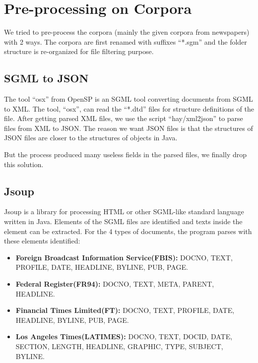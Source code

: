 \section{Pre-processing on Corpora}

We tried to pre-process the corpora (mainly the given corpora from newspapers) with 2 ways.
The corpora are first renamed with suffixes \enquote{*.sgm} and the folder structure is re-organized for file filtering purpose.

\subsection{SGML to JSON}

The tool \enquote{osx} from OpenSP\cite{openSP} is an SGML tool converting documents from SGML to XML. The tool, \enquote{osx}, can read the \enquote{*.dtd} files for structure definitions of the file. After getting parsed XML files, we use the script \enquote{hay/xml2json} to parse files from XML to JSON. The reason we want JSON files is that the structures of JSON files are closer to the structures of objects in Java.

But the process produced many useless fields in the parsed files, we finally drop this solution.

\subsection{Jsoup}

Jsoup is a library for processing HTML or other SGML-like standard language written in Java. Elements of the SGML files are identified and texts inside the element can be extracted. For the 4 types of documents, the program parses with these elements identified:
\vspace{.1cm}
\begin{itemize}
    \item \textbf{Foreign Broadcast Information Service(FBIS):} DOCNO, TEXT, PROFILE, DATE, HEADLINE, BYLINE, PUB, PAGE.
    \item \textbf{Federal Register(FR94):} DOCNO, TEXT, META, PARENT, HEADLINE.
    \item \textbf{Financial Times Limited(FT):} DOCNO, TEXT, PROFILE, DATE, HEADLINE, BYLINE, PUB, PAGE.
    \item \textbf{Los Angeles Times(LATIMES):} DOCNO, TEXT, DOCID, DATE, SECTION, LENGTH, HEADLINE, GRAPHIC, TYPE, SUBJECT, BYLINE.
\end{itemize}

